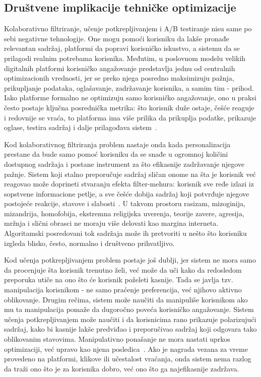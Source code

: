 \subsection{Društvene implikacije tehničke optimizacije}

Kolaborativno filtriranje, učenje potkrepljivanjem i A/B testiranje nisu same po sebi negativne tehnologije. One mogu pomoći korisniku da lakše pronađe relevantan sadržaj, platformi da popravi korisničko iskustvo, a sistemu da se prilagodi realnim potrebama korisnika. Međutim, u poslovnom modelu velikih digitalnih platformi korisničko angažovanje predstavlja jednu od centralnih optimizacionih vrednosti, jer se preko njega posredno maksimizuju pažnja, prikupljanje podataka, oglašavanje, zadržavanje korisnika, a samim tim - prihod. Iako platforme formalno ne optimizuju samo korisničko angažovanje, ono u praksi često postaje ključna posrednička metrika: što korisnik duže ostaje, češće reaguje i redovnije se vraća, to platforma ima više prilika da prikuplja podatke, prikazuje oglase, testira sadržaj i dalje prilagođava sistem~\cite{gonzalez2024attention}.

Kod kolaborativnog filtriranja problem nastaje onda kada personalizacija prestane da bude samo pomoć korisniku da se snađe u ogromnoj količini dostupnog sadržaja i postane instrument za što efikasnije zadržavanje njegove pažnje. Sistem koji stalno preporučuje sadržaj sličan onome na šta je korisnik već reagovao može doprineti stvaranju efekta filter-mehura: korisnik sve ređe izlazi iz sopstvene informacione petlje, a sve češće dobija sadržaj koji potvrđuje njegove postojeće reakcije, stavove i slabosti~\cite{nguyen2014filterbubble}. U takvom prostoru rasizam, mizoginija, mizandrija, homofobija, ekstremna religijska uverenja, teorije zavere, agresija, mržnja i slični obrasci ne moraju više delovati kao margina interneta. Algoritamski posredovani tok sadržaja može ih pretvoriti u nešto što korisniku izgleda blisko, često, normalno i društveno prihvatljivo.

Kod učenja potkrepljivanjem problem postaje još dublji, jer sistem ne mora samo da procenjuje šta korisnik trenutno želi, već može da uči kako da redosledom preporuka utiče na ono što će korisnik poželeti kasnije. Tada se javlja tzv. manipulacija korisnikom - ne samo praćenje preferencija, već njihovo aktivno oblikovanje. Drugim rečima, sistem može naučiti da manipuliše korisnikom ako mu ta manipulacija pomaže da dugoročno poveća korisničko angažovanje. Sistem učenja potkrepljivanjem može naučiti i da korisnicima rano prikazuje polarizujući sadržaj, kako bi kasnije lakše predviđao i preporučivao sadržaj koji odgovara tako oblikovanim stavovima. Manipulativno ponašanje ne mora nastati uprkos optimizaciji, već upravo kao njena posledica~\cite{kasirzadeh2021user}. Ako je nagrada vezana za vreme provedeno na platformi, klikove ili učestalost vraćanja, onda sistem nema razlog da traži ono što je za korisnika dobro, već ono što ga najefikasnije zadržava.

